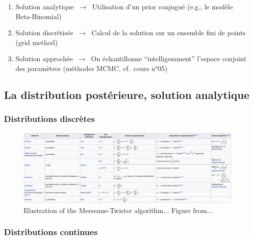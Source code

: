 \documentclass[
  a4paper,11pt,twoside,onecolumn,openright,final,oldfontcommands]{memoir}
\theoremstyle{definition}
\theoremstyle{definition}
\theoremstyle{definition}
\theoremstyle{definition}
\theoremstyle{remark}
\begin{document}
\begin{enumerate}
\def\labelenumi{\arabic{enumi}.}
\item
  Solution analytique \(~\longrightarrow~\) Utilisation d'un prior conjugué (e.g., le modèle Beta-Binomial)
\item
  Solution discrètisée \(~\longrightarrow~\) Calcul de la solution sur un ensemble fini de points (grid method)
\item
  Solution approchée \(~\longrightarrow~\) On échantillonne ``intelligemment'' l'espace conjoint des paramètres (méthodes MCMC, cf.~cours n°05)
\end{enumerate}

\hypertarget{la-distribution-postuxe9rieure-solution-analytique}{%
\subsection{La distribution postérieure, solution analytique}\label{la-distribution-postuxe9rieure-solution-analytique}}

\hypertarget{distributions-discruxe8tes}{%
\subsubsection{Distributions discrètes}\label{distributions-discruxe8tes}}

\begin{figure}[!htb]

{\centering \includegraphics[width=1\linewidth]{figures/discrete} 

}

\caption{Illustration of the Mersenne-Twister algorithm... Figure from...}\label{fig:discrete}
\end{figure}

\hypertarget{distributions-continues}{%
\subsubsection{Distributions continues}\label{distributions-continues}}
\end{document}
